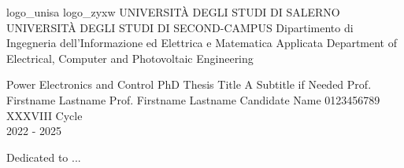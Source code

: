 \documentclass{pv_phd}
\begin{document}
\pagestyle{empty}

\setuniversities
  {logo_unisa}  
  {logo_zyxw}          
  {UNIVERSITÀ DEGLI STUDI DI SALERNO}
  {UNIVERSITÀ DEGLI STUDI DI SECOND-CAMPUS}
  {Dipartimento di Ingegneria dell’Informazione ed Elettrica e Matematica Applicata}
  {Department of Electrical, Computer and Photovoltaic Engineering}

\makefrontpage
  {Power Electronics and Control}      %
  {PhD Thesis Title}                   %
  {A Subtitle if Needed}               %
  {Prof. Firstname Lastname}           %
  {Prof. Firstname Lastname}           %
  {Candidate Name}                     %
  {0123456789}                         %
  {XXXVIII Cycle \\ 2022 - 2025}       %

\cleardoublepage
\thispagestyle{empty}

\cleardoublepage

\cleardoublepage
\begin{dedication}

    Dedicated to ...
    
\end{dedication}

\cleardoublepage
\tableofcontents
\clearpage
\sloppy
{}

\clearpage
\listoffigures
{}

\clearpage
\listoftables
{}

\cleardoublepage        %
\setcounter{page}{1}    %
\pagestyle{headings}    %
\end{document}
